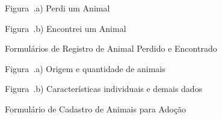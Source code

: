 \begin{figure}[H]
    \centering
    \caption{Formulários de Registro de Animal Perdido e Encontrado}
    \label{fig:tela_registro_perdi_encontrei}
    \vspace{0.15cm}
    \begin{minipage}[t]{0.46\textwidth}
        \centering
        \par\vspace{0.12cm}
        {\small Figura~\thefigure.a) Perdi um Animal}
    \end{minipage}
    \hfill
    \begin{minipage}[t]{0.46\textwidth}
        \centering
        \par\vspace{0.12cm}
        {\small Figura~\thefigure.b) Encontrei um Animal}
    \end{minipage}
    \par\vspace{0.12cm}
\end{figure}

\begin{figure}[H]
    \centering
    \caption{Formulário de Cadastro de Animais para Adoção}
    \label{fig:tela_registro_adocao}
    \vspace{0.15cm}
    \begin{minipage}[t]{0.46\textwidth}
        \centering
        \par\vspace{0.12cm}
        {\small Figura~\thefigure.a) Origem e quantidade de animais}
    \end{minipage}
    \hfill
    \begin{minipage}[t]{0.46\textwidth}
        \centering
        \par\vspace{0.12cm}
        {\small Figura~\thefigure.b) Características individuais e demais dados}
    \end{minipage}
    \par\vspace{0.12cm}
\end{figure}

